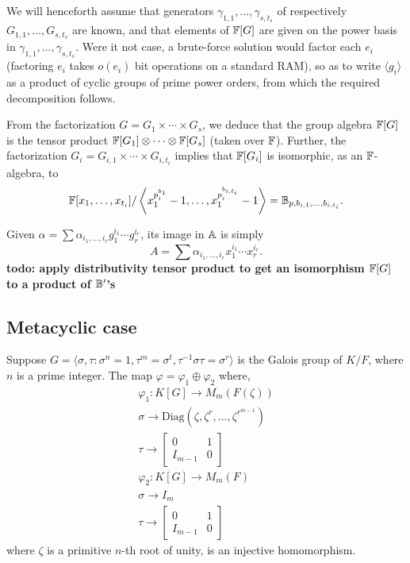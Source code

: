 We will henceforth assume that generators
$\gamma_{1,1},\dots,\gamma_{s,t_s}$ of respectively
$G_{1,1},\dots,G_{s,t_s}$ are known, and that elements of $\mathbb{F}[G]$ are
given on the power basis in $\gamma_{1,1},\dots,\gamma_{s,t_s}$. Were
it not case, a brute-force solution would factor each $e_i$ (factoring
$e_i$ takes $o(e_i)$ bit operations on a standard RAM), so as to write
$\langle g_i \rangle$ as a product of cyclic groups of prime power
orders, from which the required decomposition follows.

From the factorization $G = G_1 \times \cdots \times G_s$, we deduce
that the group algebra $\mathbb{F}[G]$ is the tensor product $\mathbb{F}[G_1]
\otimes \cdots \otimes \mathbb{F}[G_s]$ (taken over $\mathbb{F}$). Further, the 
factorization $G_i = G_{i,1} \times \cdots \times G_{i,t_i}$
implies that $\mathbb{F}[G_i]$ is isomorphic, as an $\mathbb{F}$-algebra, to
$$\mathbb{F}[x_{1},\dots,x_{t_i}]/\left \langle x_{1}^{p_i^{b_{1}}}-1,\dots,x_{1}^{p_i^{b_{i,t_i}}}-1\right\rangle
=\mathbb{B}_{p,b_{i,1},\dots,b_{i,t_i}}.$$


Given $\alpha = \sum \alpha_{i_1,\dots,i_r} g_1^{i_1}\cdots
g_r^{i_r}$, its image in $\mathbb{A}$ is simply 
$$A= \sum
\alpha_{i_1,\dots,i_r} x_1^{i_1}\cdots x_r^{i_r}.$$
{\bf todo: apply distributivity tensor product to get an isomorphism
$\mathbb{F}[G]$ to a product of $\mathbb{B}'$'s}





\subsection{Metacyclic case}


\begin{lemma}\label{lem:metinjection}
Suppose $G = \langle \sigma , \tau : \sigma^n = 1, \tau^m = \sigma^t, \tau^{-1} \sigma \tau = \sigma^r \rangle$ is the Galois group 
of $K/F$, where $n$ is a prime integer. The map $\varphi = \varphi_1 \oplus \varphi_2$ where,
\begin{equation}
\begin{split}
\varphi_1: K[G] \longrightarrow M_{m}(F(\zeta))\\
\sigma \longrightarrow \mathrm{Diag}(\zeta, \zeta^r, \ldots , \zeta^{r^{m-1}})\\
\tau \longrightarrow 
\left[ \begin{array}{l|l}
0 & 1\\
\hline
I_{m-1}& 0
\end{array} \right] \\
\varphi_2: K[G] \longrightarrow M_m(F) \\
\sigma \longrightarrow I_m \\
\tau \longrightarrow 
\left[ \begin{array}{l|l}
0 & 1\\
\hline
I_{m-1}& 0
\end{array} \right] 
\end{split}
\end{equation}
where $\zeta$ is a primitive $n$-th root of unity, is an injective homomorphism.
\end{lemma}

